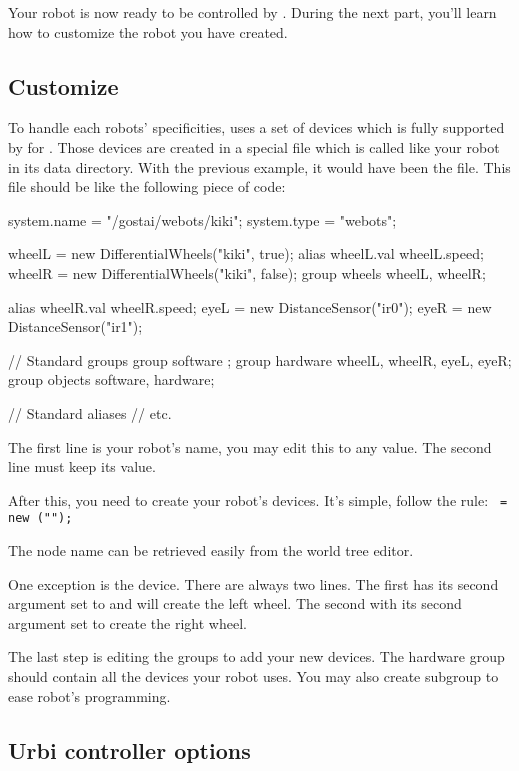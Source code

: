 Your robot is now ready to be controlled by \urbi. During the next
part, you'll learn how to customize the robot you have created.


\subsection{Customize}

To handle each robots' specificities, \webots uses a set of devices
which is fully supported by \urbi for \webots. Those devices are
created in a special file which is called like your robot in its data
directory.  With the previous example, it would have been the
 file. This file should be like the following
piece of code:

\begin{urbiunchecked}
system.name = "/gostai/webots/kiki";
system.type = "webots";


wheelL = new DifferentialWheels("kiki", true);
alias wheelL.val wheelL.speed;
wheelR = new DifferentialWheels("kiki", false);
group wheels {wheelL, wheelR};

alias wheelR.val wheelR.speed;
eyeL = new DistanceSensor("ir0");
eyeR = new DistanceSensor("ir1");

// Standard groups
group software {};
group hardware {wheelL, wheelR, eyeL, eyeR};
group objects {software, hardware};

// Standard aliases
// etc.
\end{urbiunchecked}

The first line is your robot's name, you may edit this to any value.
The second line must keep its value.

After this, you need to create your robot's devices. It's simple,
follow the rule: \texttt{ = new
  (""); }

The node name can be retrieved easily from the \webots world tree
editor.

One exception is the  device.  There are
always two lines. The first has its second argument set to 
and will create the left wheel. The second with its second argument
set to  create the right wheel.

The last step is editing the groups to add your new devices. The
hardware group should contain all the devices your robot uses. You may
also create subgroup to ease robot's programming.


\subsection{Urbi controller options}

